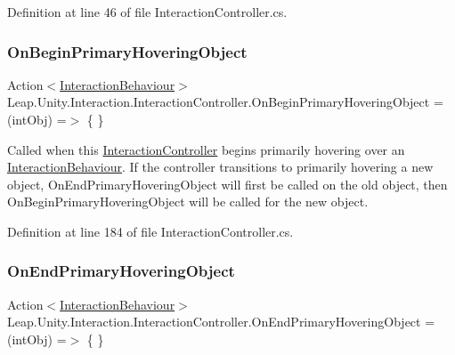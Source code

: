 Definition at line 46 of file Interaction\+Controller.\+cs.

\mbox{\label{class_leap_1_1_unity_1_1_interaction_1_1_interaction_controller_a650dbb36420d01848fe0103dd927f84c}} 
\subsubsection{\texorpdfstring{OnBeginPrimaryHoveringObject}{OnBeginPrimaryHoveringObject}}
{\footnotesize\ttfamily Action$<$\mbox{\hyperlink{class_leap_1_1_unity_1_1_interaction_1_1_interaction_behaviour}{Interaction\+Behaviour}}$>$ Leap.\+Unity.\+Interaction.\+Interaction\+Controller.\+On\+Begin\+Primary\+Hovering\+Object = (int\+Obj) =$>$ \{ \}}



Called when this \mbox{\hyperlink{class_leap_1_1_unity_1_1_interaction_1_1_interaction_controller}{Interaction\+Controller}} begins primarily hovering over an \mbox{\hyperlink{class_leap_1_1_unity_1_1_interaction_1_1_interaction_behaviour}{Interaction\+Behaviour}}. If the controller transitions to primarily hovering a new object, On\+End\+Primary\+Hovering\+Object will first be called on the old object, then On\+Begin\+Primary\+Hovering\+Object will be called for the new object. 



Definition at line 184 of file Interaction\+Controller.\+cs.

\mbox{\label{class_leap_1_1_unity_1_1_interaction_1_1_interaction_controller_a5f8e8be344906d62743703848f2f20bb}} 
\subsubsection{\texorpdfstring{OnEndPrimaryHoveringObject}{OnEndPrimaryHoveringObject}}
{\footnotesize\ttfamily Action$<$\mbox{\hyperlink{class_leap_1_1_unity_1_1_interaction_1_1_interaction_behaviour}{Interaction\+Behaviour}}$>$ Leap.\+Unity.\+Interaction.\+Interaction\+Controller.\+On\+End\+Primary\+Hovering\+Object = (int\+Obj) =$>$ \{ \}}



